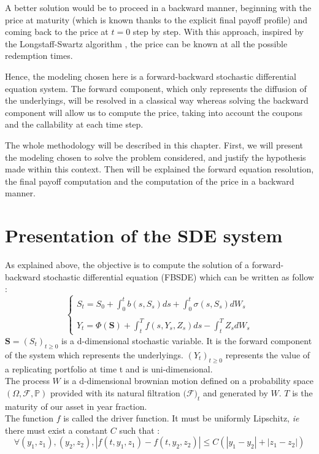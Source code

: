 \documentclass[a4paper,11pt,english]{book}
\begin{document}
A better solution would be to proceed in a backward manner, beginning with the price at maturity (which is known thanks to the explicit final payoff profile) and coming back to the price at $t=0$ step by step. With this approach, inspired by the Longstaff-Swartz algorithm \cite{schwartz2001valuing}, the price can be known at all the possible redemption times.

Hence, the modeling chosen here is a forward-backward stochastic differential equation system. The forward component, which only represents the diffusion of the underlyings, will be resolved in a classical way whereas solving the backward component will allow us to compute the price, taking into account the coupons and the callability at each time step.

The whole methodology will be described in this chapter. First, we will present the modeling chosen to solve the problem considered, and justify the hypothesis made within this context. Then will be explained the forward equation resolution, the final payoff computation and the computation of the price in a backward manner.


\section{Presentation of the SDE system}
\label{sec:SDE-presentation}
As explained above, the objective is to compute the solution of  a forward-backward stochastic differential equation (FBSDE) which can be written as follow :
$$\begin{cases}
S_{t} = S_{0}+\int_{0}^{t}b(s,S_{s})ds +\int_{0}^{t} \sigma(s,S_{s})dW_{s}\\
 \\
Y_{t} = \Phi(\textbf{S}) + \int_{t}^{T}f(s,Y_{s},Z_{s})ds -\int_{t}^{T}Z_{s}dW_{s}
\end{cases}$$
$\textbf{S}=(S_{t})_{t\geq0}$ is a d-dimensional stochastic variable. It is the forward component of the system which represents the underlyings. $(Y_{t})_{t\geq0}$ represents the value of a replicating portfolio at time t and is uni-dimensional.\\
The process $W$ is a d-dimensional brownian motion defined on a probability space $(\Omega,\mathcal{F},\mathbb{P})$ provided with its natural filtration $(\mathcal{F)}_{t}$ and generated by $W$. 
$T$ is the maturity of our asset in year fraction.\\

The function $f$ is called the driver function. It must be uniformly Lipschitz, \textit{ie} there must exist a constant $C$ such that :
$$\forall (y_{1},z_{1}),(y_{2},z_{2}), |f(t,y_{1},z_{1})-f(t,y_{2},z_{2})|\leq C(|y_{1}-y_{2}|+|z_{1}-z_{2}|)$$
\end{document}
